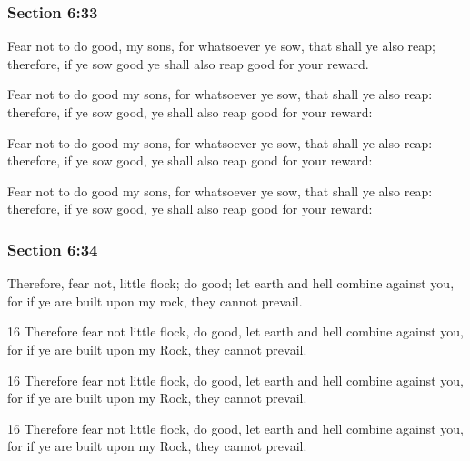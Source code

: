 	\subsubsection{Section 6:33} %
		\label{DC6-33}

		Fear not to do good, my sons, for whatsoever ye sow, that shall ye also reap; therefore, if ye sow good ye shall also reap good for your reward.

		\begin{framed}
		\scriptsize
			\begin{compactdesc}
				\item[JSP] Fear not to do good my sons, for whatsoever ye sow, that shall ye also reap: therefore, if ye sow good, ye shall also reap good for your reward:
				\item[DC 1835] Fear not to do good my sons, for whatsoever ye sow, that shall ye also reap: therefore, if ye sow good, ye shall also reap good for your reward:
				\item[DC 1844] Fear not to do good my sons, for whatsoever ye sow, that shall ye also reap: therefore, if ye sow good, ye shall also reap good for your reward:
			\end{compactdesc}
		\end{framed}

	\subsubsection{Section 6:34} %
		\label{DC6-34}

		Therefore, fear not, little flock; do good; let earth and hell combine against you, for if ye are built upon my rock, they cannot prevail.

		\begin{framed}
		\scriptsize
			\begin{compactdesc}
				\item[JSP] 16 Therefore fear not little flock, do good, let earth and hell combine against you, for if ye are built upon my Rock, they cannot prevail.
				\item[DC 1835] 16 Therefore fear not little flock, do good, let earth and hell combine against you, for if ye are built upon my Rock, they cannot prevail.
				\item[DC 1844] 16 Therefore fear not little flock, do good, let earth and hell combine against you, for if ye are built upon my Rock, they cannot prevail.
			\end{compactdesc}
		\end{framed}

